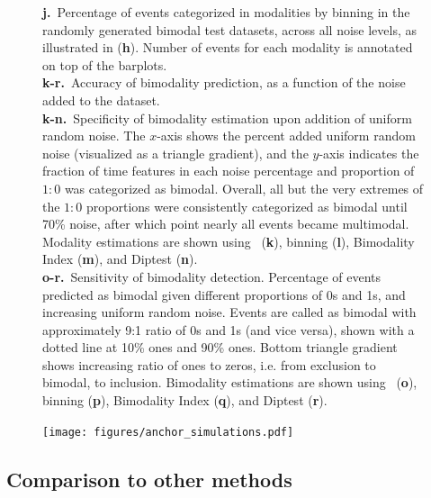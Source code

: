 \begin{figure}[h]
{\textbf{j.}~Percentage of events categorized in modalities by binning in the randomly generated bimodal test datasets, across all noise levels, as illustrated in (\textbf{h}). Number of events for each modality is annotated on top of the barplots. \\
\textbf{k-r.}~Accuracy of bimodality prediction, as a function of the noise added to the dataset. \\
\textbf{k-n.}~Specificity of bimodality estimation upon addition of uniform random noise. The $x$-axis shows the percent added uniform random noise (visualized as a triangle gradient), and the $y$-axis indicates the fraction of time features in each noise percentage and proportion of $1:0$ was categorized as bimodal. Overall, all but the very extremes of the $1:0$ proportions were consistently categorized as bimodal until 70\% noise, after which point nearly all events became multimodal. Modality estimations are shown using \anchor\, (\textbf{k}), binning (\textbf{l}), Bimodality Index (\textbf{m}), and Diptest (\textbf{n}).\\
\textbf{o-r.}~Sensitivity of bimodality detection. Percentage of events predicted as bimodal given different proportions of 0s and 1s, and increasing uniform random noise. Events are called as bimodal with approximately 9:1 ratio of 0s and 1s (and vice versa), shown with a dotted line at 10\% ones and 90\% ones. Bottom triangle gradient shows increasing ratio of ones to zeros, i.e. from exclusion to bimodal, to inclusion. Bimodality estimations are shown using \anchor\, (\textbf{o}), binning (\textbf{p}), Bimodality Index (\textbf{q}), and Diptest (\textbf{r}).
}
\label{fig:anchor_simulations}
\end{figure}
\clearpage
\begin{figure}[h]
\ContinuedFloat
\captionsetup{labelformat=empty}
\centering
\texttt{[image: figures/anchor\_simulations.pdf]}
\end{figure}
\clearpage


\subsection{Comparison to other methods}

